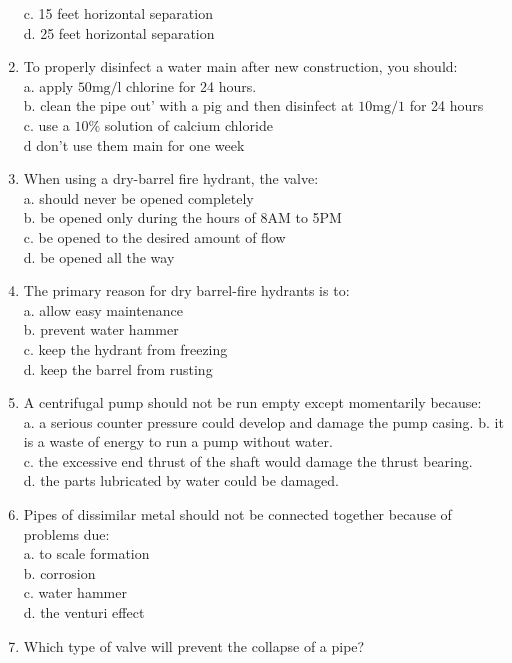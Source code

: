 \begin{enumerate}[1.]
c. 15 feet horizontal separation\\
d. 25 feet horizontal separation\\
\item To properly disinfect a water main after new construction, you should:\\
a. apply $50 \mathrm{mg} / \mathrm{l}$ chlorine for 24 hours.\\
b. clean the pipe out' with a pig and then disinfect at $10 \mathrm{mg} / 1$ for 24 hours\\
c. use a $10 \%$ solution of calcium chloride\\
$\mathrm{d}$ don't use them main for one week\\
\item When using a dry-barrel fire hydrant, the valve:\\
a. should never be opened completely\\
b. be opened only during the hours of 8AM to 5PM\\
c. be opened to the desired amount of flow\\
d. be opened all the way\\
\item The primary reason for dry barrel-fire hydrants is to:\\
a. allow easy maintenance\\
b. prevent water hammer\\
c. keep the hydrant from freezing\\
d. keep the barrel from rusting\\
\item A centrifugal pump should not be run empty except momentarily because:\\
a. a serious counter pressure could develop and damage the pump casing. b. it is a waste of energy to run a pump without water.\\
c. the excessive end thrust of the shaft would damage the thrust bearing.\\
d. the parts lubricated by water could be damaged.\\
\item Pipes of dissimilar metal should not be connected together because of problems due:\\
a. to scale formation\\
b. corrosion\\
c. water hammer\\
d. the venturi effect\\
\item Which type of valve will prevent the collapse of a pipe?\\

\end{enumerate}
